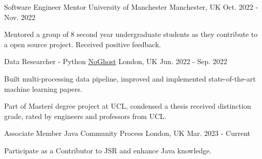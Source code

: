 



\begin{cventries}

    \cventry
        {Software Engineer Mentor} %
        {University of Manchester} %
        {Manchester, UK} %
        {Oct. 2022 - Nov. 2022} %
        {
        \begin{cvitems} %
            \item {Mentored a group of 8 second year undergraduate students as they contribute to a open source project. Received positive feedback.}
        \end{cvitems}
        }

    \cventry
        {Data Researcher - Python} %
        {\href{https://www.noghost.co.uk/}{NoGhost}} %
        {London, UK} %
        {Jun. 2022 - Sep. 2022} %
        {
        \begin{cvitems} %
            \item {Built multi-processing data pipeline, improved and implemented state-of-the-art machine learning papers.}
            \item {Part of Master\'s degree project at UCL, condensed a thesis received distinction grade, rated by engineers and professors from UCL.}
        \end{cvitems}
        }

    \cventry
        {Associate Member} %
        {Java Community Process} %
        {London, UK} %
        {Mar. 2023 - Current} %
        {
        \begin{cvitems} %
            \item {Participate as a Contributor to JSR and enhance Java knowledge.}
        \end{cvitems}
        }


\end{cventries}